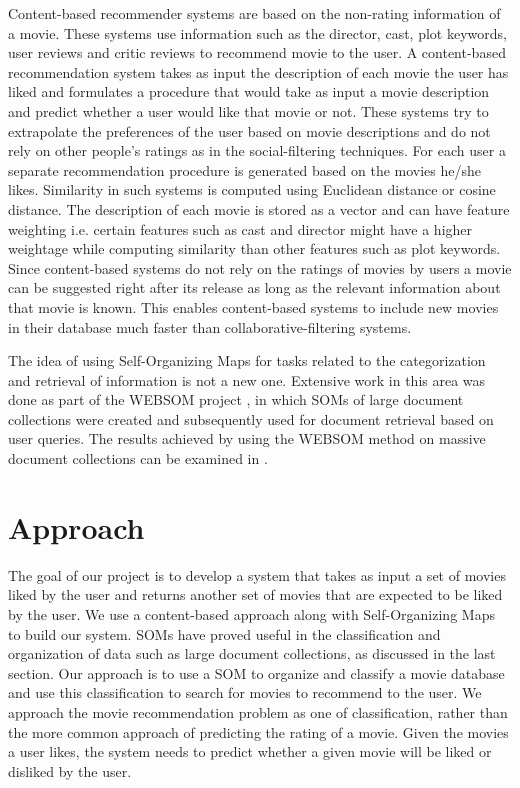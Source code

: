 \documentclass[conference]{IEEEtran}
\begin{document}
Content-based recommender systems are based on the non-rating information of a movie. These systems use information such as the director, cast, plot keywords, user reviews and critic reviews to recommend movie to the user. A content-based recommendation system takes as input the description of each movie the user has liked and formulates a procedure that would take as input a movie description and predict whether a user would like that movie or not. These systems try to extrapolate the preferences of the user based on movie descriptions and do not rely on other people’s ratings as in the social-filtering techniques. For each user a separate recommendation procedure is generated based on the movies he/she likes. Similarity in such systems is computed using Euclidean distance or cosine distance. The description of each movie is stored as a vector and can have feature weighting i.e. certain features such as cast and director might have a higher weightage while computing similarity than other features such as plot keywords. Since content-based systems do not rely on the ratings of movies by users a movie can be suggested right after its release as long as the relevant information about that movie is known. This enables content-based systems to include new movies in their database much faster than collaborative-filtering systems.

The idea of using Self-Organizing Maps for tasks related to the categorization and retrieval of information is not a new one. Extensive work in this area was done as part of the WEBSOM project \cite{kaski1998websom}, in which SOMs of large document collections were created and subsequently used for document retrieval based on user queries. The results achieved by using the WEBSOM method on massive document collections can be examined in \cite{lagus2004mining}.


\section{Approach}
The goal of our project is to develop a system that takes as input a set of movies liked by the user and returns another set of movies that are expected to be liked by the user. We use a content-based approach along with Self-Organizing Maps to build our system. SOMs have proved useful in the classification and organization of data such as large document collections, as discussed in the last section. Our approach is to use a SOM to organize and classify a movie database and use this classification to search for movies to recommend to the user. We approach the movie recommendation problem as one of classification, rather than the more common approach of predicting the rating of a movie. Given the movies a user likes, the system needs to predict whether a given movie will be liked or disliked by the user. 
\end{document}
